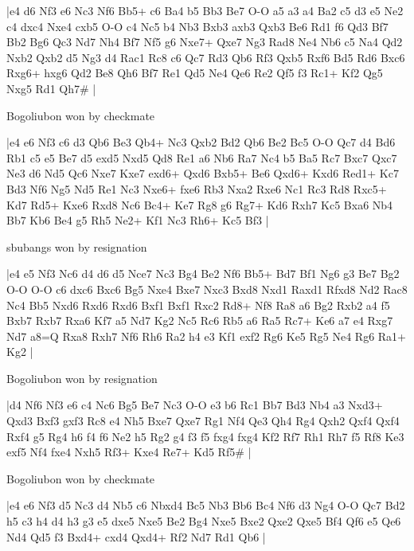 \makegametitle
|e4 d6 Nf3 e6 Nc3 Nf6 Bb5+ c6 Ba4 b5 Bb3 Be7 O-O a5 a3 a4 Ba2 c5 d3 e5 Ne2 c4 dxc4 Nxe4 cxb5 O-O c4 Nc5 b4 Nb3 Bxb3 axb3 Qxb3 Be6 Rd1 f6 Qd3 Bf7 Bb2 Bg6 Qc3 Nd7 Nh4 Bf7 Nf5 g6 Nxe7+ Qxe7 Ng3 Rad8 Ne4 Nb6 c5 Na4 Qd2 Nxb2 Qxb2 d5 Ng3 d4 Rac1 Rc8 c6 Qc7 Rd3 Qb6 Rf3 Qxb5 Rxf6 Bd5 Rd6 Bxc6 Rxg6+ hxg6 Qd2 Be8 Qh6 Bf7 Re1 Qd5 Ne4 Qe6 Re2 Qf5 f3 Rc1+ Kf2 Qg5 Nxg5 Rd1 Qh7\#  |

\showboard

Bogoliubon won by checkmate

\makegametitle
|e4 e6 Nf3 c6 d3 Qb6 Be3 Qb4+ Nc3 Qxb2 Bd2 Qb6 Be2 Bc5 O-O Qc7 d4 Bd6 Rb1 c5 e5 Be7 d5 exd5 Nxd5 Qd8 Re1 a6 Nb6 Ra7 Nc4 b5 Ba5 Rc7 Bxc7 Qxc7 Ne3 d6 Nd5 Qc6 Nxe7 Kxe7 exd6+ Qxd6 Bxb5+ Be6 Qxd6+ Kxd6 Red1+ Kc7 Bd3 Nf6 Ng5 Nd5 Re1 Nc3 Nxe6+ fxe6 Rb3 Nxa2 Rxe6 Nc1 Rc3 Rd8 Rxc5+ Kd7 Rd5+ Kxe6 Rxd8 Nc6 Bc4+ Ke7 Rg8 g6 Rg7+ Kd6 Rxh7 Kc5 Bxa6 Nb4 Bb7 Kb6 Be4 g5 Rh5 Ne2+ Kf1 Nc3 Rh6+ Kc5 Bf3  |

\showboard

sbubangs won by resignation

\makegametitle
|e4 e5 Nf3 Nc6 d4 d6 d5 Nce7 Nc3 Bg4 Be2 Nf6 Bb5+ Bd7 Bf1 Ng6 g3 Be7 Bg2 O-O O-O c6 dxc6 Bxc6 Bg5 Nxe4 Bxe7 Nxc3 Bxd8 Nxd1 Raxd1 Rfxd8 Nd2 Rac8 Nc4 Bb5 Nxd6 Rxd6 Rxd6 Bxf1 Bxf1 Rxc2 Rd8+ Nf8 Ra8 a6 Bg2 Rxb2 a4 f5 Bxb7 Rxb7 Rxa6 Kf7 a5 Nd7 Kg2 Nc5 Rc6 Rb5 a6 Ra5 Rc7+ Ke6 a7 e4 Rxg7 Nd7 a8=Q Rxa8 Rxh7 Nf6 Rh6 Ra2 h4 e3 Kf1 exf2 Rg6 Ke5 Rg5 Ne4 Rg6 Ra1+ Kg2  |

\showboard

Bogoliubon won by resignation

\makegametitle
|d4 Nf6 Nf3 e6 c4 Nc6 Bg5 Be7 Nc3 O-O e3 b6 Rc1 Bb7 Bd3 Nb4 a3 Nxd3+ Qxd3 Bxf3 gxf3 Rc8 e4 Nh5 Bxe7 Qxe7 Rg1 Nf4 Qe3 Qh4 Rg4 Qxh2 Qxf4 Qxf4 Rxf4 g5 Rg4 h6 f4 f6 Ne2 h5 Rg2 g4 f3 f5 fxg4 fxg4 Kf2 Rf7 Rh1 Rh7 f5 Rf8 Ke3 exf5 Nf4 fxe4 Nxh5 Rf3+ Kxe4 Re7+ Kd5 Rf5\#  |

\showboard

Bogoliubon won by checkmate

\makegametitle
|e4 e6 Nf3 d5 Nc3 d4 Nb5 c6 Nbxd4 Bc5 Nb3 Bb6 Bc4 Nf6 d3 Ng4 O-O Qc7 Bd2 h5 c3 h4 d4 h3 g3 e5 dxe5 Nxe5 Be2 Bg4 Nxe5 Bxe2 Qxe2 Qxe5 Bf4 Qf6 e5 Qe6 Nd4 Qd5 f3 Bxd4+ cxd4 Qxd4+ Rf2 Nd7 Rd1 Qb6  |

